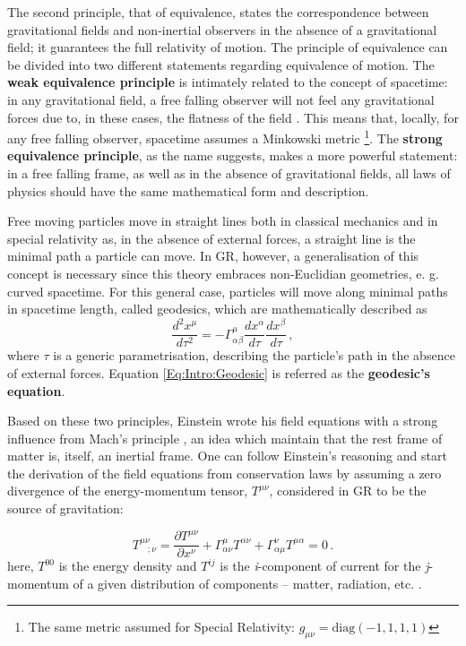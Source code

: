 \qquad The second principle, that of equivalence, states the correspondence between gravitational fields and non-inertial observers in the absence of a gravitational field; it guarantees the full relativity of motion. The principle of equivalence can be divided into two different statements regarding equivalence of motion. The \textbf{weak equivalence principle} is intimately related to the concept of spacetime: in any gravitational field, a free falling observer will not feel any gravitational forces due to, in these cases, the flatness of the field \citep{2008-EquivPrincWeak}. This means that, locally, for any free falling observer, spacetime assumes a Minkowski metric \footnote{ The same metric assumed for Special Relativity: $g_{\mu\nu} = \text{diag}(-1,1,1,1)$}. The \textbf{strong equivalence principle}, as the name suggests, makes a more powerful statement: in a free falling frame, as well as in the absence of gravitational fields, all laws of physics should have the same mathematical form and description.

\qquad Free moving particles move in straight lines both in classical mechanics and in special relativity as, in the absence of external forces, a straight line is the minimal path  a particle can move. In GR, however, a generalisation of this concept is necessary since this theory embraces non-Euclidian geometries, e. g. curved spacetime. For this general case, particles will move along minimal paths in spacetime length, called geodesics, which are mathematically described as
\begin{equation}
\frac{d^2x^{\mu}}{d\tau^2} = -\Gamma_{\alpha\beta}^{\mu}\frac{dx^{\alpha}}{d\tau}\frac{dx^{\beta}}{d\tau}\, ,
\label{Eq:Intro:Geodesic}
\end{equation}
where $\tau$ is a generic parametrisation, describing the particle's path in the absence of external forces. Equation \eqref{Eq:Intro:Geodesic} is referred as the \textbf{geodesic's equation}.

\qquad Based on these two principles, Einstein wrote his field equations with a strong influence from Mach's principle \citep{1961BransDickeMach}, an idea which maintain that the rest frame of matter is, itself, an inertial frame. One can follow Einstein's reasoning and start the derivation of the field equations from conservation laws by assuming a zero divergence of the energy-momentum tensor, $T^{\mu\nu}$, considered in GR to be the source of gravitation:

\begin{equation}
T^{\mu\nu}_{\ \ \ \ ;\nu}  = \frac{\partial T^{\mu\nu}}{\partial x^{\nu}} + \Gamma^{\mu}_{\alpha\nu}T^{\alpha\nu} + \Gamma^{\nu}_{\alpha\mu}T^{\mu\alpha}=0 \, .
\label{Eq:Intro:EnergyMomentDiver}
\end{equation}
here, $T^{00}$ is the energy density and $T^{ij}$ is the \textit{i}-component of current for the \textit{j}-momentum of a given distribution of components -- matter, radiation, etc. \citep{Peacock,dods,schneider_2016}.

